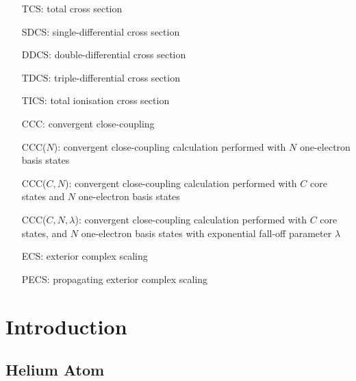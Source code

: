 \documentclass[]{article}
\def\mainmatter{%
    \pagenumbering{arabic}
    \setcounter{page}{1}
    \setcounter{section}{0}
    \renewcommand{\thesection}{\arabic{section}}
}%
\begin{document}
\begin{itemize}
\item[TCS:] total cross section
\item[SDCS:] single-differential cross section
\item[DDCS:] double-differential cross section
\item[TDCS:] triple-differential cross section
\item[TICS:] total ionisation cross section
\item[CCC:] convergent close-coupling
\item[CCC($N$):] convergent close-coupling calculation performed with $N$
  one-electron basis states
\item[CCC($C, N$):] convergent close-coupling calculation performed with $C$ core
  states and $N$ one-electron basis states
\item[CCC($C, N, \lambda$):] convergent close-coupling calculation performed with
  $C$ core states, and $N$ one-electron basis states with exponential fall-off
  parameter $\lambda$
\item[ECS:] exterior complex scaling
\item[PECS:] propagating exterior complex scaling
\end{itemize}

\clearpage

\mainmatter

\section{Introduction}
\label{sec:in}


\subsection{Helium Atom}
\label{sec:in-he}

\end{document}
